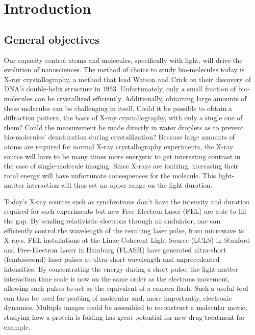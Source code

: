 \section{Introduction}


\subsection{General objectives}


Our capacity control atoms and molecules, specifically with light,
will drive the evolution of nanosciences. The method of choice to study 
bio-molecules today is X-ray crystallography, a method that lead Watson and 
Crick on their discovery of DNA's double-helix structure in 1953. 
Unfortunately, only a small fraction of bio-molecules can be crystallized 
efficiently. Additionally, obtaining large amounts of these molecules can be 
challenging in itself. Could it be possible to obtain a diffraction pattern, 
the basis of X-ray crystallography, with only a single one of them? Could the 
measurement be made directly in water droplets as to prevent bio-molecules' 
denaturation during crystallization? Because large amounts of atoms are 
required for normal X-ray crystallography experiments, the X-ray source will 
have to be many times more energetic to get interesting contrast in the 
case of single-molecule imaging. Since X-rays are ionizing, increasing their 
total energy will have unfortunate consequences for the molecule. This 
light-matter interaction will thus set an upper range on the light duration.

Today's X-ray sources such as synchrotrons don't have the intensity and
duration required for such experiments but new Free-Electron Laser (FEL) are
able to fill the gap. By sending relativistic electrons through an ondulator,
one can efficiently control the wavelength of the resulting laser pulse, from
microwave to X-rays. FEL installations at the Linac Coherent Light Source
(LCLS) in Stanford and Free-Electron Laser in Hamburg (FLASH) have generated
ultra-short (femtosecond) laser pulses at ultra-short wavelength and
unprecedented intensities. By concentrating the energy during a short pulse,
the light-matter interaction time scale is now on the same order as the
electrons movement, allowing such pulses to act as the equivalent of a camera
flash. Such a useful tool can thus be used for probing of molecular
and, more importantly, electronic dynamics. Multiple images could be assembled
to reconstruct a molecular movie; studying how a protein is folding has great
potential for new drug treatment for example.


